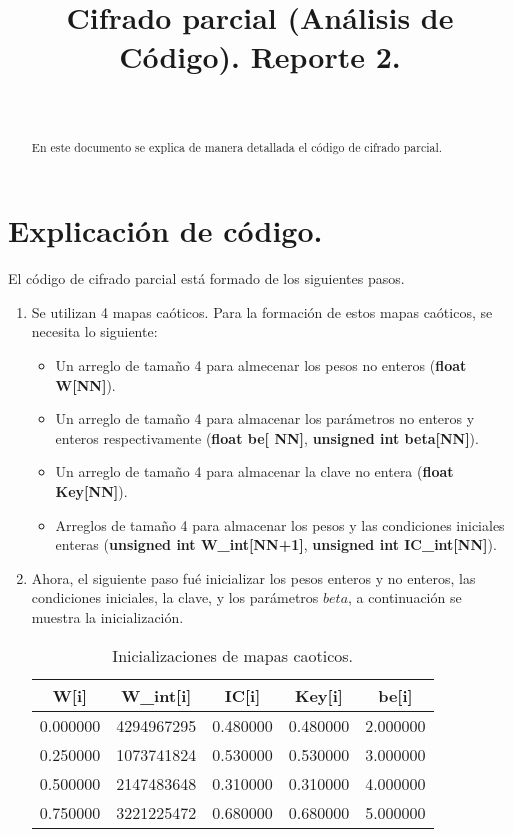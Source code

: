 \documentclass[10pt]{IEEEtran}
\title {Cifrado parcial (Análisis de Código). Reporte 2.}
\author{\IEEEauthorblockN{Marcos Daniel Calderón Calderón}\\
\IEEEauthorblockA{Maestría en Ciencias de la Computación\\
Centro de Investigación en Matemáticas (CIMAT)\\
Guanajuato , Gto.\\
marcos.calderon@cimat.mx}}
\begin{document}
\maketitle
\begin{abstract}
En este documento se explica de manera detallada el código de cifrado parcial.
\end{abstract}
\section{Explicación de código.}

El código de cifrado parcial está formado de los siguientes pasos.


\begin{enumerate}
\item Se utilizan 4 mapas caóticos. Para la formación de estos mapas caóticos, se necesita lo siguiente:


\begin{itemize}
\item Un arreglo de tamaño 4 para almecenar los pesos no enteros (\textbf{float W[NN]}).
\item Un arreglo de tamaño 4 para almacenar los parámetros no enteros y enteros respectivamente (\textbf{float be[	NN]}, \textbf{unsigned int beta[NN]}).
\item Un arreglo de tamaño 4 para almacenar la clave no entera (\textbf{float Key[NN]}).

\item 	Arreglos de tamaño 4 para almacenar los pesos y las condiciones iniciales enteras (\textbf{unsigned int W\_int[NN+1]},\textbf{ unsigned int IC\_int[NN]}).
\end{itemize}


\item Ahora, el siguiente paso fué inicializar los pesos enteros y no enteros, las condiciones iniciales, la clave, y los parámetros $beta$, a continuación se muestra la inicialización.


\begin{table}[H]
\centering
\caption{Inicializaciones de mapas caoticos.}
\begin{tabular}[c]{|c|c|c|c|c|}
\hline
\hline
W[i]  	 &  W\_int[i] 	 &   IC[i] 	 &  Key[i] 	 &  be[i]  \\
\hline
\hline
0.000000	 &  4294967295 & 	0.480000 & 	0.480000	 & 	2.000000    \\ 
0.250000	 & 	1073741824 & 	0.530000	 & 	0.530000	 & 	3.000000  \\   
0.500000	 & 	2147483648 & 	0.310000	 & 	0.310000	 & 	4.000000  \\   
0.750000	 & 	3221225472 & 	0.680000	 & 	0.680000	 & 	5.000000 \\


\end{tabular}
\end{table}
\end{enumerate}
\end{document}
